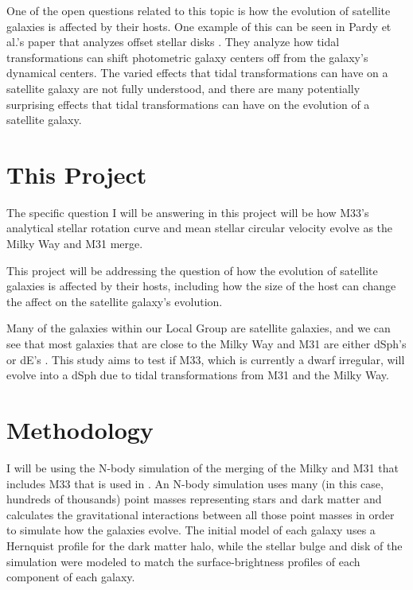 \documentclass[trackchanges, twocolumn]{aastex7}
\begin{document}
One of the open questions related to this topic is how the evolution of satellite galaxies is affected by their hosts. One example of this can be seen in Pardy et al.'s paper that analyzes offset stellar disks \citep{Pardy2016}. They analyze how tidal transformations can shift photometric galaxy centers off from the galaxy's dynamical centers. The varied effects that tidal transformations can have on a satellite galaxy are not fully understood, and there are many potentially surprising effects that tidal transformations can have on the evolution of a satellite galaxy.

\section{This Project} \label{sec:style}

The specific question I will be answering in this project will be how M33's analytical stellar rotation curve and mean stellar circular velocity evolve as the Milky Way and M31 merge.

This project will be addressing the question of how the evolution of satellite galaxies is affected by their hosts, including how the size of the host can change the affect on the satellite galaxy's evolution.

Many of the galaxies within our Local Group are satellite galaxies, and we can see that most galaxies that are close to the Milky Way and M31 are either dSph's or dE's \citep{Mayer2001}. This study aims to test if M33, which is currently a dwarf irregular, will evolve into a dSph due to tidal transformations from M31 and the Milky Way.
\newline
\section{Methodology}

I will be using the N-body simulation of the merging of the Milky and M31 that includes M33 that is used in \cite{MarelBesla2012}. An N-body simulation uses many (in this case, hundreds of thousands) point masses representing stars and dark matter and calculates the gravitational interactions between all those point masses in order to simulate how the galaxies evolve. The initial model of each galaxy uses a Hernquist profile \citep{Hernquist1990} for the dark matter halo, while the stellar bulge and disk of the simulation were modeled to match the surface-brightness profiles of each component of each galaxy. 
\end{document}

